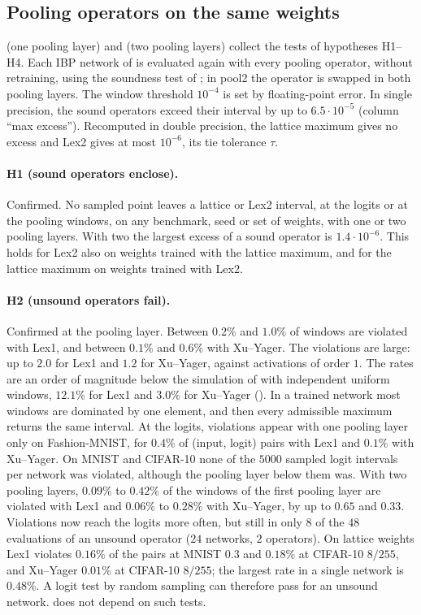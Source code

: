 \subsection{Pooling operators on the same weights}

 (one pooling layer) and  (two pooling layers) collect the tests of hypotheses H1--H4. Each IBP network of  is evaluated again with every pooling operator, without retraining, using the soundness test of ; in pool2 the operator is swapped in both pooling layers. The window threshold $10^{-4}$ is set by floating-point error. In single precision, the sound operators exceed their interval by up to $6.5\cdot10^{-5}$ (column ``max excess''). Recomputed in double precision, the lattice maximum gives no excess and Lex2 gives at most $10^{-6}$, its tie tolerance $\tau$.



\paragraph{H1 (sound operators enclose).} Confirmed. No sampled point leaves a lattice or Lex2 interval, at the logits or at the pooling windows, on any benchmark, seed or set of weights, with one or two pooling layers. With two the largest excess of a sound operator is $1.4\cdot10^{-6}$. This holds for Lex2 also on weights trained with the lattice maximum, and for the lattice maximum on weights trained with Lex2.

\paragraph{H2 (unsound operators fail).} Confirmed at the pooling layer. Between $0.2\%$ and $1.0\%$ of windows are violated with Lex1, and between $0.1\%$ and $0.6\%$ with Xu--Yager. The violations are large: up to $2.0$ for Lex1 and $1.2$ for Xu--Yager, against activations of order $1$. The rates are an order of magnitude below the simulation of  with independent uniform windows, $12.1\%$ for Lex1 and $3.0\%$ for Xu--Yager (). In a trained network most windows are dominated by one element, and then every admissible maximum returns the same interval. At the logits, violations appear with one pooling layer only on Fashion-MNIST, for $0.4\%$ of (input, logit) pairs with Lex1 and $0.1\%$ with Xu--Yager. On MNIST and CIFAR-10 none of the $5000$ sampled logit intervals per network was violated, although the pooling layer below them was. With two pooling layers, $0.09\%$ to $0.42\%$ of the windows of the first pooling layer are violated with Lex1 and $0.06\%$ to $0.28\%$ with Xu--Yager, by up to $0.65$ and $0.33$. Violations now reach the logits more often, but still in only $8$ of the $48$ evaluations of an unsound operator ($24$ networks, $2$ operators). On lattice weights Lex1 violates $0.16\%$ of the pairs at MNIST $0.3$ and $0.18\%$ at CIFAR-10 $8/255$, and Xu--Yager $0.01\%$ at CIFAR-10 $8/255$; the largest rate in a single network is $0.48\%$. A logit test by random sampling can therefore pass for an unsound network.  does not depend on such tests.


